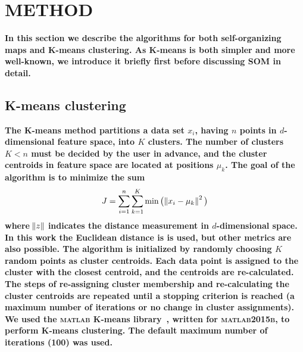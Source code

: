 
\section{METHOD}
\label{sec: method_somz}

\textbf{In this section we describe the algorithms for both self-organizing maps and K-means clustering. As K-means is both simpler and more well-known, we introduce it briefly first before discussing SOM in detail.} 


\subsection{K-means clustering}
\label{sec: kmeans_method}

\textbf{
The K-means method partitions a data set $x_i$, having $n$ points in $d$-dimensional feature space, into $K$ clusters.
The number of clusters $K<n$ must be decided by the user in advance, and the cluster centroids in feature space are located at positions $\mu_k$.
The goal of the algorithm is to minimize the sum
\begin{equation}
\label{eq:km_sos}
J = \sum_{i=1}^n \sum_{k=1}^K \min \big( \norm{x_i - \mu_k}^2 \big)
\end{equation}
where $\norm{z}$ indicates the distance measurement in $d$-dimensional space. In this work the Euclidean distance is is used, but other metrics are also possible.
The algorithm is initialized by randomly choosing $K$ random points as cluster centroids.
Each data point is assigned to the cluster with the closest centroid, and the centroids are re-calculated.
The steps of re-assigning cluster membership and re-calculating the cluster centroids are repeated until a stopping criterion is reached (a maximum number of iterations or no change in cluster assignments).
We used the \textsc{matlab} K-means library~\citep{Seber84, Spath85}, written for \textsc{matlab2015b}, to perform  K-means clustering.
The default maximum number of iterations (100) was used.
}


